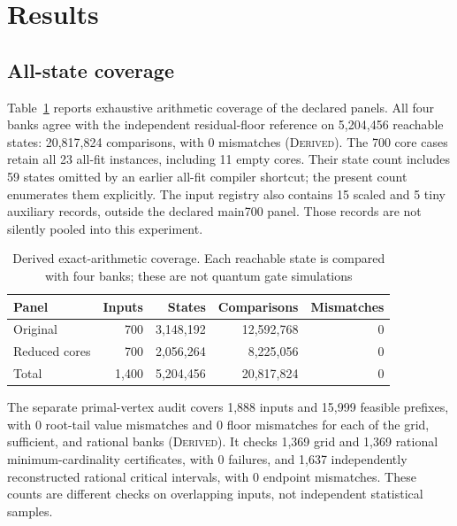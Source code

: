 \documentclass[referee,pdflatex,sn-mathphys-num]{sn-jnl}
\theoremstyle{thmstyleone}
\theoremstyle{thmstyletwo}
\begin{document}
\section{Results}\label{sec:results}
\subsection{All-state coverage}
Table~\ref{tab:coverage} reports exhaustive arithmetic coverage of the declared panels. All four banks agree with the independent residual-floor reference on 5,204,456 reachable states: 20,817,824 comparisons, with 0 mismatches (\textsc{Derived}). The 700 core cases retain all 23 all-fit instances, including 11 empty cores. Their state count includes 59 states omitted by an earlier all-fit compiler shortcut; the present count enumerates them explicitly. The input registry also contains 15 scaled and 5 tiny auxiliary records, outside the declared main700 panel. Those records are not silently pooled into this experiment.

\begin{table}[t]
\caption{Derived exact-arithmetic coverage. Each reachable state is compared with four banks; these are not quantum gate simulations}\label{tab:coverage}
\centering\small
\begin{tabular}{lrrrr}
\toprule
Panel & Inputs & States & Comparisons & Mismatches\\
\midrule
Original & 700 & 3,148,192 & 12,592,768 & 0\\
Reduced cores & 700 & 2,056,264 & 8,225,056 & 0\\
Total & 1,400 & 5,204,456 & 20,817,824 & 0\\
\bottomrule
\end{tabular}
\end{table}

The separate primal-vertex audit covers 1,888 inputs and 15,999 feasible prefixes, with 0 root-tail value mismatches and 0 floor mismatches for each of the grid, sufficient, and rational banks (\textsc{Derived}). It checks 1,369 grid and 1,369 rational minimum-cardinality certificates, with 0 failures, and 1,637 independently reconstructed rational critical intervals, with 0 endpoint mismatches. These counts are different checks on overlapping inputs, not independent statistical samples.
\end{document}
